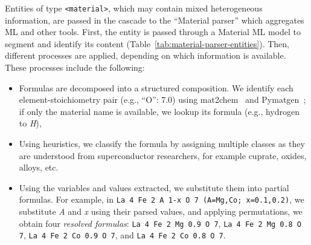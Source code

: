 Entities of type \texttt{<material>}, which may contain mixed heterogeneous information, are passed in the cascade to the ``Material parser'' which aggregates ML and other tools.
First, the entity is passed through a Material ML model to segment and identify its content (Table~\ref{tab:material-parser-entities}).
Then, different processes are applied, depending on which information is available. 
These processes include the following:
\begin{itemize}
    \item Formulas are decomposed into a structured composition. We identify each element-stoichiometry pair (e.g., ``O'': 7.0) using mat2chem~\cite{kononova2019text} and Pymatgen~\cite{Ong2013}; if only the material name is available, we lookup its formula (e.g., hydrogen to \textit{H}),
    \item Using heuristics, we classify the formula by assigning multiple classes as they are understood from superconductor researchers, for example cuprate, oxides, alloys, etc.
    \item Using the variables and values extracted, we substitute them into partial formulas. For example, in \texttt{La 4 Fe 2 A 1-x O 7 (A=Mg,Co; x=0.1,0.2)}, we substitute \textit{A} and \textit{x} using their parsed values, and applying permutations, we obtain four \textit{resolved formulas}: \texttt{La 4 Fe 2 Mg 0.9 O 7}, \texttt{La 4 Fe 2 Mg 0.8 O 7}, \texttt{La 4 Fe 2 Co 0.9 O 7}, and \texttt{La 4 Fe 2 Co 0.8 O 7}.
\end{itemize}

